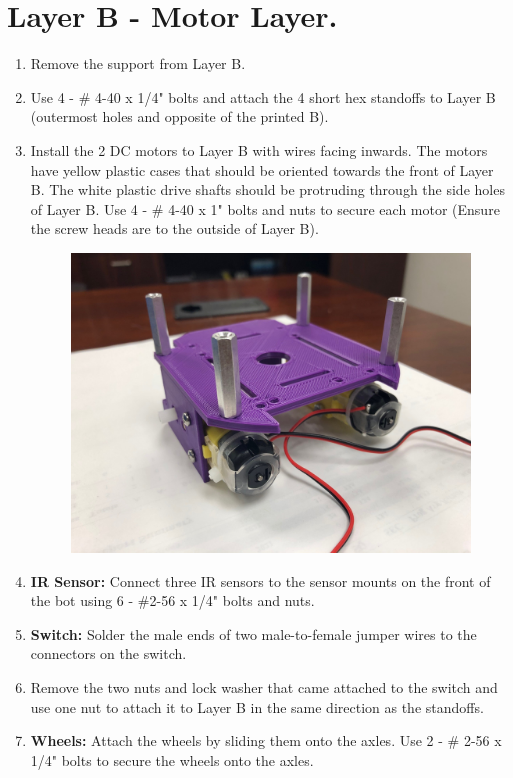 \documentclass{handout}
\begin{document}
	\section{Layer B - Motor Layer.}
	\begin{enumerate}
		\item Remove the support from Layer B.
		\item Use 4 - \# 4-40 x 1/4" bolts and attach the 4 short hex standoffs to Layer B (outermost holes and opposite of the printed B).
		\item Install the 2 DC motors to Layer B with wires facing inwards. The motors have yellow plastic cases that should be oriented towards the front of Layer B. The white plastic drive shafts should be protruding through the side holes of Layer B. Use 4 - \# 4-40 x 1" bolts and nuts to secure each motor (Ensure the screw heads are to the outside of Layer B).
		
		\begin{figure} [H]
			\centering
			\includegraphics[width=.75\textwidth]{3.jpg}
		\end{figure}
		
		\item \textbf{IR Sensor:} Connect three IR sensors to the sensor mounts on the front of the bot using 6 - \#2-56 x 1/4" bolts and nuts.
		\item \textbf{Switch:} Solder the male ends of two male-to-female jumper wires to the connectors on the switch.
		\item Remove the two nuts and lock washer that came attached to the switch and use one nut to attach it to Layer B in the same direction as the standoffs.
		
		\item \textbf{Wheels:} Attach the wheels by sliding them onto the axles. Use 2 - \# 2-56 x 1/4" bolts to secure the wheels onto the axles.
		

\end{enumerate}
\end{document}
